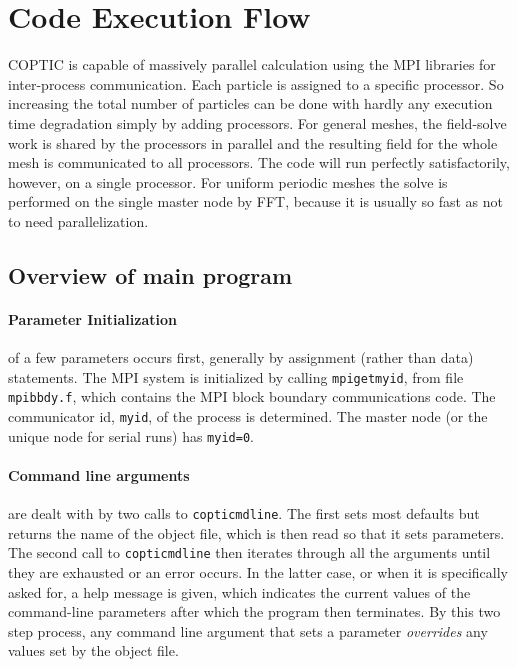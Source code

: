 \documentclass[12pt]{article}
\begin{document}
\section{Code Execution Flow}

COPTIC is capable of massively parallel calculation using the MPI
libraries for inter-process communication. Each particle is assigned
to a specific processor. So increasing the total number of particles
can be done with hardly any execution time degradation simply by
adding processors. For general meshes, the field-solve work is shared
by the processors in parallel and the resulting field for the whole
mesh is communicated to all processors. The code will run perfectly
satisfactorily, however, on a single processor. For uniform periodic
meshes the solve is performed on the single master node by FFT, because
it is usually so fast as not to need parallelization.

\subsection{Overview of main program}

\paragraph{Parameter Initialization} of a few parameters occurs
first, generally by assignment (rather than data) statements. The MPI
system is initialized by calling \verb!mpigetmyid!, from file
\verb!mpibbdy.f!, which contains the MPI block boundary communications
code. The communicator id, \verb!myid!, of the process is
determined. The master node (or the unique node for serial runs) has
\verb!myid=0!. 

\paragraph{Command line arguments} are dealt with by two calls to
\verb!copticmdline!. The first sets most defaults but returns the name
of the object file, which is then read so that it sets parameters.
The second call to \verb!copticmdline! then iterates through all the
arguments until they are exhausted or an error occurs. In the latter case,
or when it is specifically asked for, a help message is given, which
indicates the current values of the command-line parameters after
which the program then terminates. By this two step process, any
command line argument that sets a parameter \emph{overrides} any
values set by the object file.
\end{document}
